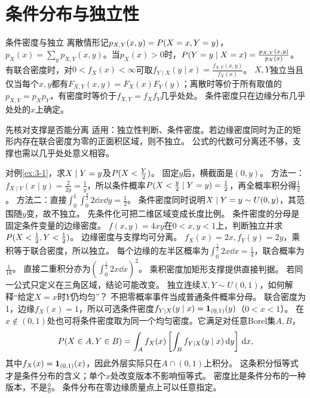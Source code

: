 \section{条件分布与独立性}\label{sec:32}
\begin{definition}{条件密度与独立}
离散情形记$p_{X,Y}(x,y)=P(X=x,Y=y)$，$p_X(x)=\sum_y p_{X,Y}(x,y)$。当$p_X(x)>0$时，$P(Y=y\mid X=x)=\frac{p_{X,Y}(x,y)}{p_X(x)}$。
有联合密度时，对$0<f_X(x)<\infty$可取$f_{Y\mid X}(y\mid x)=\frac{f_{X,Y}(x,y)}{f_X(x)}$。
$X,Y$独立当且仅当每个$x,y$都有$F_{X,Y}(x,y)=F_X(x)F_Y(y)$；离散时等价于所有取值的$p_{X,Y}=p_Xp_Y$，有密度时等价于$f_{X,Y}=f_Xf_Y$几乎处处。
条件密度只在边缘分布几乎处处的$x$上确定。
\end{definition}
\begin{method}{先核对支撑是否能分离}
适用：独立性判断、条件密度。若边缘密度同时为正的矩形内存在联合密度为零的正面积区域，则不独立。
公式的代数可分离还不够，支撑也需以几乎处处意义相容。
\end{method}
{对例\ref{ex:3-1}，求$X\mid Y=y$及$P(X<\frac{Y}{2})$。}
{固定$y$后，横截面是$(0,y)$。}
{方法一：$f_{X\mid Y}(x\mid y)=\frac{2}{2y}=\frac{1}{y}$，所以条件概率$P(X<\frac{y}{2}\mid Y=y)=\frac{1}{2}$，再全概率积分得$\frac{1}{2}$。
方法二：直接$\int_0^1\int_0^{\frac{y}{2}}2\dd x\dd y=\frac{1}{2}$。
条件密度同时说明$X\mid Y=y\sim U(0,y)$，其范围随$y$变，故不独立。}
{先条件化可把二维区域变成长度比例。}
{条件密度的分母是固定条件变量的边缘密度。}
{$f(x,y)=4xy$在$0<x,y<1$上，判断独立并求$P(X<\frac{1}{2},Y<\frac{1}{2})$。}
{边缘密度与支撑均可分离。}
{$f_X(x)=2x,f_Y(y)=2y$，乘积等于联合密度，所以独立。
每个边缘的左半区概率为$\int_0^{\frac{1}{2}}2x\dd x=\frac{1}{4}$，联合概率为$\frac{1}{16}$。
直接二重积分亦为$(\int_0^{\frac{1}{2}}2x\dd x)^2$。}
{乘积密度加矩形支撑提供直接判据。}
{若同一公式只定义在三角区域，结论可能改变。}
{独立连续$X,Y\sim U(0,1)$，如何解释“给定$X=x$时$Y$仍均匀”？}
{不把零概率事件当成普通条件概率分母。}
{联合密度为1，边缘$f_X(x)=1$，所以可选条件密度$f_{Y\mid X}(y\mid x)=\mathbf1_{(0,1)}(y)$（$0<x<1$）。
在$x\notin(0,1)$处也可将条件密度取为同一个均匀密度。它满足对任意Borel集$A,B$，
\[P(X\in A,Y\in B)=\int_A f_X(x)\left[\int_B f_{Y\mid X}(y\mid x)\,\mathrm d y\right]\,\mathrm d x,\]
其中$f_X(x)=\mathbf1_{(0,1)}(x)$，因此外层实际只在$A\cap(0,1)$上积分。
这条积分恒等式才是条件分布的含义；单个$x$处改变版本不影响恒等式。}
{密度比是条件分布的一种版本，不是$\frac{0}{0}$。}
{条件分布在零边缘质量点上可以任意指定。}

